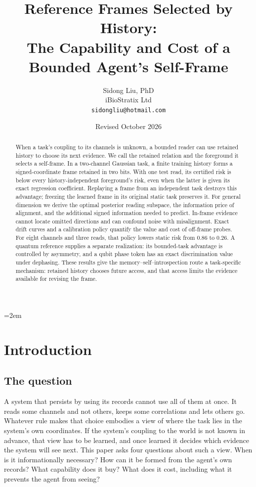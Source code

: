 \documentclass[12pt]{article}
\title{Reference Frames Selected by History:\\
The Capability and Cost of a Bounded Agent's Self-Frame}
\author{Sidong Liu, PhD \\
\small iBioStratix Ltd \\
\small \texttt{sidongliu@hotmail.com}}
\date{Revised October 2026}
\theoremstyle{definition}
\begin{document}
\emergencystretch=2em
\raggedbottom
\maketitle

\begin{abstract}
When a task's coupling to its channels is unknown, a bounded reader can
use retained history to choose its next evidence. We call the retained relation and
the foreground it selects a self-frame. In a two-channel Gaussian task,
a finite training history forms a signed-coordinate frame retained in
two bits. With one test read, its certified
risk is below every history-independent foreground's risk, even when
the latter is given its exact regression coefficient. Replaying a frame
from an independent task destroys this advantage; freezing the learned
frame in its original static task preserves it.
For general dimension we derive the optimal posterior reading subspace,
the information price of alignment, and the additional signed information
needed to predict. In-frame evidence cannot locate omitted directions
and can confound noise with misalignment. Exact drift curves and a
calibration policy quantify the value and cost of off-frame probes.
For eight channels and three reads, that policy lowers static risk
from $0.86$ to $0.26$.
A quantum reference supplies a separate realization: its bounded-task
advantage is controlled by asymmetry, and a qubit phase token has an
exact discrimination value under dephasing.
These results give the memory--self--introspection route a task-specific
mechanism: retained history chooses future access, and that access
limits the evidence available for revising the frame.
\end{abstract}

\section{Introduction}
\label{sec:intro}

\subsection{The question}

A system that persists by using its records cannot use all of them at once. It reads some channels and not others, keeps some correlations and lets others go. Whatever rule makes that choice embodies a view of where the task lies in the system's own coordinates. If the system's coupling to the world is not known in advance, that view has to be learned, and once learned it decides which evidence the system will see next. This paper asks four questions about such a view. When is it informationally necessary? How can it be formed from the agent's own records? What capability does it buy? What does it cost, including what it prevents the agent from seeing?
\end{document}
